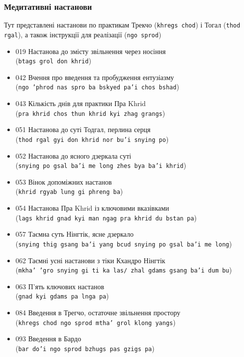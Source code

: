\documentclass{article}
\begin{document}
\subsubsection{Медитативні настанови}

Тут представлені настанови по практикам Трекчо (\texttt{khregs chod}) і Тогал (\texttt{thod rgal}),
а також інструкції для реалізації (\texttt{ngo sprod})

\begingroup\raggedright
\begin{itemize}
\item 019 Настанова до змісту звільнення через носіння \\ (\texttt{btags grol don khrid})
\item 042 Вчення про введення та пробудження ентузіазму \\ (\texttt{ngo 'phrod nas spro ba bskyed pa'i chos bshad})
\item 043 Кількість днів для практики Пра Khrid \\ (\texttt{pra khrid chos thun khrid kyi zhag grangs})
\item 051 Настанова до суті Тодгал, перлина серця \\ (\texttt{thod rgal gyi don khrid nor bu'i snying po})
\item 052 Настанова до ясного дзеркала суті \\ (\texttt{snying po gsal ba'i me long zhes bya ba'i khrid})
\item 053 Вінок допоміжних настанов \\ (\texttt{khrid rgyab lung gi phreng ba})
\item 054 Настанова Пра Khrid із ключовими вказівками \\ (\texttt{lags khrid gnad kyi man ngag pra khrid du bstan pa})
\item 057 Таємна суть Нінгтік, ясне дзеркало \\ (\texttt{snying thig gsang ba'i yang bcud snying po gsal ba'i me long})
\item 062 Таємні усні настанови з тіки Кхандро Нінгтік \\ (\texttt{mkha' 'gro snying gi ti ka las/ zhal gdams gsang ba'i dum bu})
\item 063 П’ять ключових настанов \\ (\texttt{gnad kyi gdams pa lnga pa})
\item 084 Введення в Трегчо, остаточне звільнення простору \\ (\texttt{khregs chod ngo sprod mtha' grol klong yangs})
\item 093 Введення в Бардо \\ (\texttt{bar do'i ngo sprod bzhugs pas gzigs pa})

\end{itemize}
\end{document}
